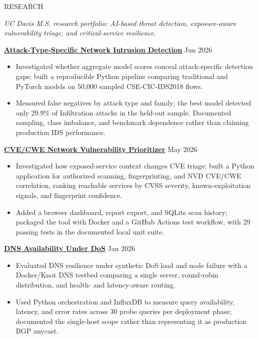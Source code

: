 \documentclass{resume}
\begin{document}
\begin{rSection}{RESEARCH}

\textit{UC Davis M.S. research portfolio: AI-based threat detection, exposure-aware vulnerability triage, and critical-service resilience.}

\href{https://github.com/section9-us/Network_ids-neural-vs-traditional-attack-eval}{\textbf{Attack-Type-Specific Network Intrusion Detection}} \hfill Jun 2026
\begin{itemize}
    \itemsep -4pt {}
    \item Investigated whether aggregate model scores conceal attack-specific detection gaps; built a reproducible Python pipeline comparing traditional and PyTorch models on 50,000 sampled CSE-CIC-IDS2018 flows.
    \item Measured false negatives by attack type and family; the best model detected only 29.9\% of Infiltration attacks in the held-out sample. Documented sampling, class imbalance, and benchmark dependence rather than claiming production IDS performance.
\end{itemize}

\href{https://github.com/section9-us/Security_CVE-CWE-Network-Prioritizer}{\textbf{CVE/CWE Network Vulnerability Prioritizer}} \hfill May 2026
\begin{itemize}
    \itemsep -4pt {}
    \item Investigated how exposed-service context changes CVE triage; built a Python application for authorized scanning, fingerprinting, and NVD CVE/CWE correlation, ranking reachable services by CVSS severity, known-exploitation signals, and fingerprint confidence.
    \item Added a browser dashboard, report export, and SQLite scan history; packaged the tool with Docker and a GitHub Actions test workflow, with 29 passing tests in the documented local unit suite.
\end{itemize}

\href{https://github.com/section9-us/Security_Resilient-DNS-Against-DDoS}{\textbf{DNS Availability Under DoS}} \hfill Jan 2026
\begin{itemize}
    \itemsep -4pt {}
    \item Evaluated DNS resilience under synthetic DoS load and node failure with a Docker/Knot DNS testbed comparing a single server, round-robin distribution, and health- and latency-aware routing.
    \item Used Python orchestration and InfluxDB to measure query availability, latency, and error rates across 30 probe queries per deployment phase; documented the single-host scope rather than representing it as production BGP anycast.
\end{itemize}

\end{rSection}
\end{document}
